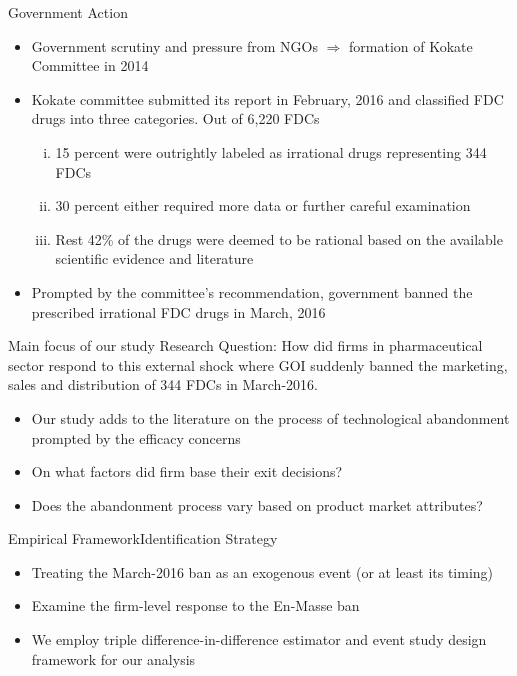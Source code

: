 \documentclass[aspectratio=43]{beamer}
\begin{document}
\begin{frame}{Government Action}
	\begin{itemize}
		\item Government scrutiny and pressure from NGOs $\boldsymbol{\Rightarrow}$ formation of Kokate Committee in 2014
		\medskip
		\pause
		\item Kokate committee submitted its report in February, 2016 and classified FDC drugs into three categories. Out of 6,220 FDCs
		\pause
		\begin{enumerate}[(i)]
			\item 15 percent were outrightly labeled as irrational drugs representing 344 FDCs
			\pause
			\item 30 percent either required more data or further careful examination
			\pause
			\item Rest 42\% of the drugs were deemed to be rational based on the available scientific evidence and literature
		\end{enumerate}
			\medskip
	\pause
	\item Prompted by the committee’s recommendation, government banned the prescribed irrational FDC
	drugs in March, 2016
	\end{itemize}
\end{frame}

\begin{frame}{Main focus of our study}
	\alert{Research Question:} How did firms in pharmaceutical sector respond to this external shock where GOI suddenly banned the marketing, sales and distribution of 344 FDCs in March-2016.
	\pause
	\medskip
	\begin{itemize}
		\item Our study adds to the literature on the process of technological abandonment prompted by the efficacy concerns
		\pause
		\medskip
		\item On what factors did firm base their exit decisions?
		\pause
		\medskip
		\item Does the abandonment process vary based on product market attributes?
	\end{itemize}
\end{frame}

	\begin{frame}{Empirical Framework}{Identification Strategy}
	\begin{itemize}
		\pause
		\item Treating the March-2016 ban as an exogenous event (or at least its timing)
		\pause
		\medskip
		\item Examine the firm-level response to the En-Masse ban
		\medskip
		\pause
		\item We employ triple difference-in-difference estimator and event study design framework for our analysis
	\end{itemize}
\end{frame}
\end{document}

